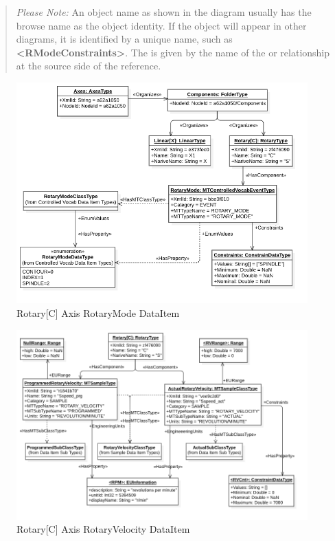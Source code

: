 \begin{quote}
    \textit{Please Note:} An object name as shown in the diagram usually has the browse name as the object identity. If the object will appear in other diagrams, it is identified by a unique name, such as \textbf{<RModeConstraints>}. The  is given by the name of the  or  relationship at the source side of the reference. 
\end{quote}

\begin{figure}[ht]
    \centering
    \includegraphics[width=1.0\textwidth]{diagrams/mtconnect-mapping/rotary-c-rotary-mode.png}
    \caption{Rotary[C] Axis RotaryMode DataItem}
    \label{fig:rotary-c-rotary-mode}
\end{figure}

\FloatBarrier

\begin{figure}[ht]
    \centering
    \includegraphics[width=1.0\textwidth]{diagrams/mtconnect-mapping/rotary-c-rotary-velocity.png}
    \caption{Rotary[C] Axis RotaryVelocity DataItem}
    \label{fig:rotary-c-rotary-velocity}
\end{figure}


